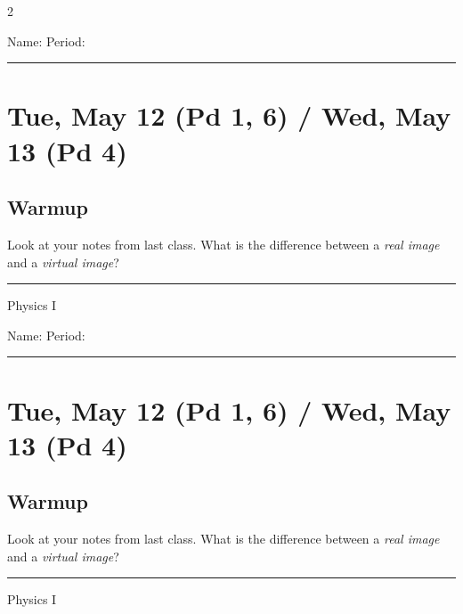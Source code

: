 \documentclass[10pt,landscape]{exam}
\def\todayDate{Tue, May 12 (Pd 1, 6) / Wed, May 13 (Pd 4)}
\def\content{
Look at your notes from last class.  What is the difference between a \emph{real image} and a \emph{virtual image}?
}
\begin{document}
\pagestyle{empty}

\setlength{\columnsep}{0.8in}
\begin{multicols*}{2}

\noindent  
Name: \hfill Period: \hspace{5em}
\vspace{0.5em}
\hrule

\section*{\todayDate}
\subsection*{Warmup}

\content

\vfill
\hrule
\vspace{0.5em}
\hfill {\sc Physics I}

\columnbreak

\noindent  
Name: \hfill Period: \hspace{5em}
\vspace{0.5em}
\hrule

\section*{\todayDate}
\subsection*{Warmup}

\content

\vfill
\hrule
\vspace{0.5em}
\hfill {\sc Physics I}

\end{multicols*}
\end{document}
